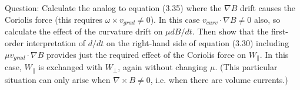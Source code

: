 \documentclass{article}
\begin{document}
\subsection{}
Question: Calculate the analog to equation (3.35) where the $\nabla B$ drift causes the Coriolis force (this requires $\omega \times v_{grad}\neq 0$).
In this case $v_{curv}\cdot \nabla B\neq 0$ also, so calculate the effect of the curvature drift on $\mu dB/dt$.
Then show that the first-order interpretation of $d/dt$ on the right-hand side of equation (3.30) including $\mu v_{grad}\cdot \nabla B$ provides just the required effect of the Coriolis force on $W_\parallel$.
In this case, $W_\parallel$ is exchanged with $W_\perp$, again without changing $\mu$. 
(This particular situation can only arise when $\nabla \times B\neq 0$, i.e. when there are volume currents.)
\end{document}
